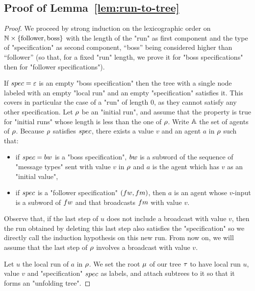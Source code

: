 \subsection{Proof of Lemma~\ref{lem:run-to-tree}}

\LemRunToTree*

\begin{proof}
	
	We proceed by strong induction on the lexicographic order on $\mathbb{N} \times \{\text{follower}, \text{boss}\}$ with the length of the "run" as first component and the type of "specification" as second component, ``boss'' being considered higher than ``follower'' (so that, for a fixed "run" length, we prove it for "boss specifications" then for "follower specifications"). 
	
	If $\spec = \epsilon$ is an empty "boss specification" then the tree with a single node labeled with an empty "local run" and an empty "specification" satisfies it.
	This covers in particular the case of a "run" of length $0$, as they cannot satisfy any other specification.
	Let $\rho$ be an "initial run", and assume that the property is true for "initial runs" whose length is less than the one of $\rho$. Write $\mathbb{A}$ the set of agents of $\rho$.
	Because $\rho$ satisfies $\spec$, there exists a value $v$ and an agent $a$ in $\rho$ such that:
	\begin{itemize}
	\item if $\spec= \bossspec$ is a "boss specification", $\bossspec$ is a subword of the sequence of "message types" sent with value $v$ in $\rho$ and $a$ is the agent which has $v$ as an "initial value",
	\item if $\spec$ is a "follower specification" $(\followwordspec, \followmessagespec)$, then $a$ is an agent whose $v$-input is a subword of $\followwordspec$ and that broadcasts $\followmessagespec$ with value $v$. 
	\end{itemize}

	Observe that, if the last step of $u$ does not include a broadcast with value $v$, then the run obtained by deleting this last step also satisfies the "specification" so we directly call the induction hypothesis on this new run. From now on, we will assume that the last step of $\rho$ involves a broadcast with value $v$. 

	Let $u$ the local run of $a$ in $\rho$. We set the root $\mu$ of our tree $\tau$ to have local run $u$, value $v$ and "specification" $\spec$ as labels, and attach subtrees to it so that it forms an "unfolding tree".


\end{proof}
